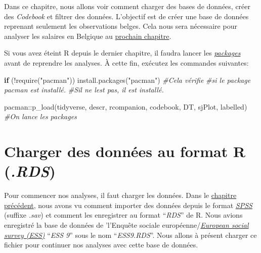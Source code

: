 \documentclass[
]{book}
\newenvironment{Shaded}{\begin{snugshade}}{\end{snugshade}}
\newcommand{\CommentTok}[1]{\textcolor[rgb]{0.56,0.35,0.01}{\textit{#1}}}
\newcommand{\ControlFlowTok}[1]{\textcolor[rgb]{0.13,0.29,0.53}{\textbf{#1}}}
\newcommand{\FunctionTok}[1]{\textcolor[rgb]{0.00,0.00,0.00}{#1}}
\newcommand{\NormalTok}[1]{#1}
\newcommand{\SpecialCharTok}[1]{\textcolor[rgb]{0.00,0.00,0.00}{#1}}
\newcommand{\StringTok}[1]{\textcolor[rgb]{0.31,0.60,0.02}{#1}}
\begin{document}
Dans ce chapitre,
nous allons voir comment charger des bases de données, créer des \emph{Codebook} et filtrer des données. L'objectif est de créer une base de données reprenant seulement les observations belges. Cela nous sera nécessaire pour analyser les salaires en Belgique au \protect\hyperlink{salaire_belge_stat_desc}{prochain chapitre}.

Si vous avez éteint R depuis le dernier chapitre, il faudra lancer les \protect\hyperlink{packages}{\emph{packages}} avant de reprendre les analyses. À cette fin, exécutez les commandes suivantes:

\begin{Shaded}
\begin{Highlighting}[]
\ControlFlowTok{if}\NormalTok{ (}\SpecialCharTok{!}\FunctionTok{require}\NormalTok{(}\StringTok{"pacman"}\NormalTok{)) }\FunctionTok{install.packages}\NormalTok{(}\StringTok{"pacman"}\NormalTok{) }\CommentTok{\#Cela vérifie}
                             \CommentTok{\#si le package pacman est installé.}
                             \CommentTok{\#S\textquotesingle{}il ne l\textquotesingle{}est pas, il est installé.}

\NormalTok{pacman}\SpecialCharTok{::}\FunctionTok{p\_load}\NormalTok{(tidyverse, descr, rcompanion, codebook,}
\NormalTok{               DT, sjPlot, labelled) }\CommentTok{\#On lance les packages}
\end{Highlighting}
\end{Shaded}

\hypertarget{charger-des-donnuxe9es-au-format-r-.rds}{%
\section{\texorpdfstring{Charger des données au format R (\emph{.RDS})}{Charger des données au format R (.RDS)}}\label{charger-des-donnuxe9es-au-format-r-.rds}}

Pour commencer nos analyses, il faut charger les données. Dans le \protect\hyperlink{import_donnees}{chapitre précédent}, nous avons vu comment importer des données depuis le format \href{https://www.ibm.com/fr-fr/products/spss-statistics}{\emph{SPSS}} (suffixe \emph{.sav}) et comment les enregistrer au format ``\emph{RDS}'' de R. Nous avions enregistré la base de données de 'l'Enquête sociale européenne/\href{https://www.europeansocialsurvey.org/}{\emph{European social survey (ESS)}} ``\emph{ESS 9}'' sous le nom ``\emph{ESS9.RDS}''. Nous allons à présent charger ce fichier pour continuer nos analyses avec cette base de données.
\end{document}

